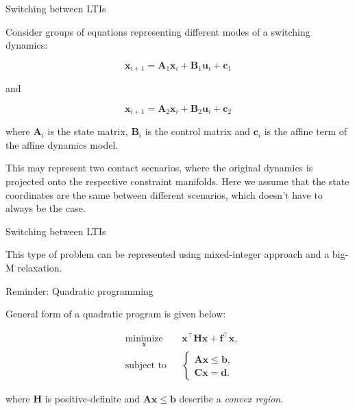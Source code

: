 \documentclass{beamer}
\begin{document}
\begin{frame}{Switching between LTIs}
\begin{flushleft}

Consider groups of equations representing different modes of a switching dynamics:

\begin{equation}
    \mathbf{x}_{i+1} = \mathbf{A}_1 \mathbf{x}_i + \mathbf{B}_1 \mathbf{u}_i + \mathbf{c}_1
\end{equation}

and

\begin{equation}
    \mathbf{x}_{i+1} = \mathbf{A}_2 \mathbf{x}_i + \mathbf{B}_2 \mathbf{u}_i + \mathbf{c}_2
\end{equation}

where $\mathbf{A}_i$ is the state matrix, $\mathbf{B}_i$ is the control matrix and $\mathbf{c}_i$ is the affine term of the affine dynamics model.

\bigskip

This may represent two contact scenarios, where the original dynamics is projected onto the respective constraint manifolds. Here we assume that the state coordinates are the same between different scenarios, which doesn't have to always be the case.

\end{flushleft}
\end{frame}


\begin{frame}{Switching between LTIs}
\begin{flushleft}

This type of problem can be represented using mixed-integer approach and a big-M relaxation.

\end{flushleft}
\end{frame}


\begin{frame}{Reminder: Quadratic programming}
\begin{flushleft}

General form of a quadratic program is given below:

%
\begin{equation}
\begin{aligned}
& \underset{\mathbf{x}}{\text{minimize}}
& & \mathbf{x}^\top \mathbf{H} \mathbf{x} + \mathbf{f}^\top\mathbf{x}, \\
& \text{subject to}
& & \begin{cases}
    \mathbf{A}\mathbf{x} \leq \mathbf{b}, \\
    \mathbf{C}\mathbf{x} = \mathbf{d}.
    \end{cases}
\end{aligned}
\end{equation}

where $\mathbf{H}$ is positive-definite and $\mathbf{A}\mathbf{x} \leq \mathbf{b}$ describe a \emph{convex region}.

\end{flushleft}
\end{frame}
\end{document}
